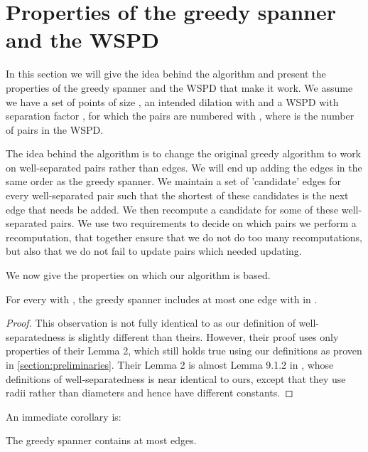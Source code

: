 \documentclass[runningheads,envcountsame,oribibl,orivec]{llncs}
\begin{document}
\section{Properties of the greedy spanner and the WSPD} \label{section:properties}

In this section we will give the idea behind the algorithm and present the properties of the greedy spanner and the WSPD that make it work. We assume we have a set of points  of size , an intended dilation  with  and a WSPD with separation factor , for which the pairs are numbered  with , where  is the number of pairs in the WSPD.


The idea behind the algorithm is to change the original greedy algorithm to work on well-separated pairs rather than edges. We will end up adding the edges in the same order as the greedy spanner. We maintain a set of 'candidate' edges for every well-separated pair such that the shortest of these candidates is the next edge that needs be added. We then recompute a candidate for some of these well-separated pairs. We use two requirements to decide on which pairs we perform a recomputation, that together ensure that we do not do too many recomputations, but also that we do not fail to update pairs which needed updating.

We now give the properties on which our algorithm is based.

\begin{observation} \label{observation:wspdgreedy}
 For every  with , the greedy spanner includes at most one edge  with  in .
\end{observation}
\begin{proof}
This observation is not fully identical to \cite{BoseCFMS2010} as our definition of well-separatedness is slightly different than theirs. However, their proof uses only properties of their Lemma 2, which still holds true using our definitions as proven in \ref{section:preliminaries}. Their Lemma 2 is almost Lemma 9.1.2 in \cite{Narasimhan:2007:GSN:1208237}, whose definitions of well-separatedness is near identical to ours, except that they use radii rather than diameters and hence have different constants.
\end{proof}

An immediate corollary is:

\begin{observation} \label{observation:greedyedges}
 The greedy spanner contains at most  edges.
\end{observation}
\end{document}
